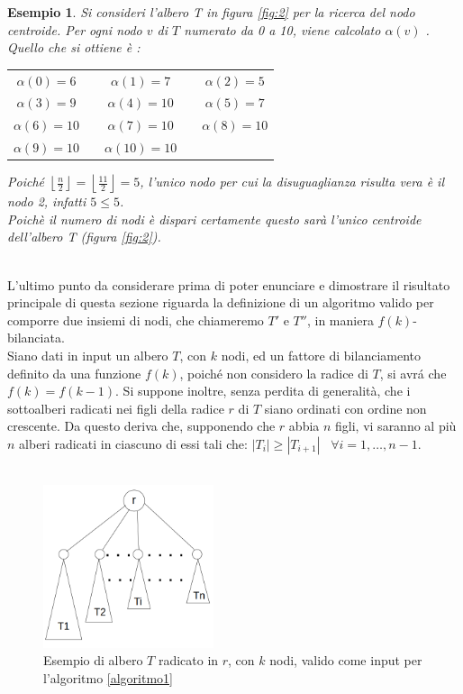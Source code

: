 \newtheorem{esempio}[definizione]{Esempio}
\begin{esempio}
	\label{es1}
Si consideri l'albero T in figura \ref{fig:2} per la ricerca del nodo centroide.
Per ogni nodo $ v $ di $ T $ numerato da 0 a 10,  viene calcolato $\alpha(v)$ . \\
Quello che si ottiene \`e :


\begin{center}
	\begin{tabular}{ c c c c c  }
		$\alpha(0) = 6$ & & $\alpha(1) = 7$ & & $\alpha(2) = 5$ \\ 
		$\alpha(3) = 9$ && $\alpha(4) = 10$ &&  $\alpha(5) =  7$ \\  
		$\alpha(6) = 10$ && $\alpha(7) = 10$ && $\alpha(8) = 10$ \\
		$\alpha(9) = 10$ && $\alpha(10) = 10$ &&
	\end{tabular}
\end{center}

Poich\'e $ \left\lfloor\frac{n}{2} \right\rfloor = \left\lfloor \frac{11}{2} \right\rfloor = 5$, l'unico nodo per cui la disuguaglianza risulta vera \`e il nodo 2, infatti $5\le 5$.\\
Poich\`e il numero di nodi \`e dispari certamente questo sar\`a l'unico centroide dell'albero T (figura \ref{fig:2}). 
\demo
\end{esempio}\mbox{}\\

L'ultimo punto da considerare prima di poter enunciare e dimostrare il risultato principale di questa sezione riguarda la definizione di un algoritmo valido per comporre due insiemi di nodi, che chiameremo $ T' $ e $ T'' $, in maniera $ f(k) $-bilanciata.\\
Siano dati in input un albero $ T $, con $ k $ nodi, ed un fattore di bilanciamento definito da una funzione $ f(k) $, poich\'e non considero la radice di $ T $, si avr\'a che $ f(k) = f(k-1) $.
Si suppone inoltre, senza perdita di generalit\`a, che i sottoalberi radicati nei figli della radice $ r $ di $ T $ siano ordinati con ordine non crescente.
Da questo deriva che, supponendo che $ r $ abbia $ n $ figli, vi saranno al pi\`u $  n $ alberi radicati in ciascuno di essi tali che: $ |T_i| \ge |T_{i+1}|$ \ $ \forall i = 1,\dots, n-1 $.\mbox{}\\\\

	\begin{figure}[htbp]
	\centering
	\includegraphics[width=5cm]{capitolo3/grafo3}
	\caption{Esempio di albero $ T $ radicato in $ r $, con $ k $ nodi, valido come input per l'algoritmo \ref{algoritmo1}} 
	\label{fig:3}
\end{figure}
\mbox{}\\

